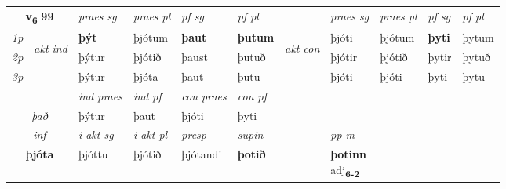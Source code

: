 \noindent
\begin{tabular}{lllllllllll} \toprule
\multicolumn{2}{c}{\textbf{v{\textsubscript{6}}} \Large{\textbf{99}}}  &  \textit{praes sg}  & \textit{praes pl}  &\textit{ pf sg} & \textit{pf pl} &  &  \textit{praes sg}  & \textit{praes pl}  & \textit{pf sg} & \textit{pf pl } \\*
	\cmidrule{3-6} \cmidrule{8-11}
 {\textit{1p}} & \multirow{3}{*}{\begin{turn}{90}\textit{akt ind}\end{turn}} & \textbf{þýt} & þjótum & \textbf{þaut} & \textbf{þutum} & \multirow{3}{*}{\begin{turn}{90}\textit{akt con}\end{turn}} &þjóti & þjótum & \textbf{þyti} & þytum\\*
 {\textit{2p}} &  &  þýtur  & þjótið & þaust & þutuð & & þjótir & þjótið & þytir & þytuð \\*
{\textit{3p}} &  & þýtur & þjóta & þaut & þutu & & þjóti & þjóti& þyti & þytu \\*
\cmidrule{3-6} \cmidrule{8-11}

   & &  \textit{ind praes} & \textit{ind pf} & \textit{con praes} & \textit{con pf} \\*
\multicolumn{2}{c}{ \textit{það} } & þýtur & þaut & þjóti & þyti \\*

\cmidrule{3-8}
   \multicolumn{2}{c}{\textit{inf}}  & \textit{i akt sg} & \textit{i akt pl}   & \textit{presp} & \textit{supin}  && \textit{pp m} \\*
  \multicolumn{2}{c}{\textbf{þjóta}} & þjóttu  & þjótið   & þjótandi &  \textbf{þotið}  && \specialcell{\textbf{þotinn} \\ adj\textbf{\textsubscript{6-2}}} \\*
\end{tabular}

